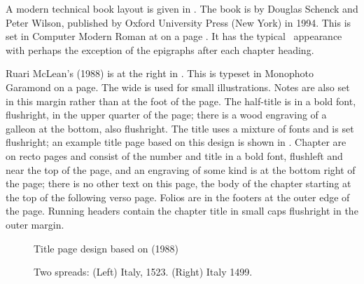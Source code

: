\documentclass[10pt,a4paper,oneside,extrafontsizes]{memoir}%
\begin{document}
\begin{paracol}{2}
\switchEng
    A modern technical book layout is given in . The book
is  by Douglas Schenck and Peter
Wilson, published by Oxford University Press (New York) in 1994. This is
set in Computer Modern Roman at  
on a page . 
It has the typical \ltx\ appearance with perhaps the exception of the
epigraphs after each chapter heading.

Ruari McLean's  (1988) is at the right in . This is typeset in  
Monophoto Garamond 
on a  page. The wide
\foredge{} is used for small illustrations. 
Notes are also set in this
margin rather than at the foot of the page.
The half-title 
is in a bold font, flushright, in the 
upper quarter of the page; there is a wood engraving of a galleon at the 
bottom, also flushright. The title uses a mixture of fonts
and is set flushright; an example title page based on this design is shown
in . Chapter are on recto
pages and consist of the number and title in a bold font, flushleft and near
the top of the page, and an engraving of some kind is at the bottom
right of the page; there is no other text on this page, the body of
the chapter starting at the top of the following verso page. 
Folios are in the footers at the outer edge
of the page. Running headers contain the chapter
title in small caps flushright in the outer margin.
\end{paracol}

\begin{figure}
\centering
\begin{showtitle}
\titleTH
\end{showtitle}
\caption{Title page design based on  (1988)} \label{fig:titleTH}
\end{figure}


\begin{figure}
\centering
\begin{minipage}[b]{\pwlayi}
\end{minipage}
\hfill
\begin{minipage}[b]{\pwlayi}
\end{minipage}
\caption[Two spreads: Italy, 1523 and 1499]%
        {Two spreads: (Left) Italy, 1523.
         (Right) Italy 1499.} \label{fb:8}
\end{figure}
\end{document}
